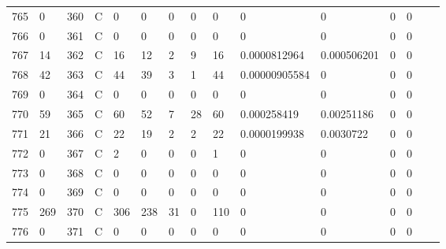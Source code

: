 \begin{longtable}{lllllllllllllll}
	765 & 0                 & 360 & C   & 0                 & 0                 & 0                 & 0    & 0          & 0              & 0              & 0             & 0            \\
	766 & 0                 & 361 & C   & 0                 & 0                 & 0                 & 0    & 0          & 0              & 0              & 0             & 0            \\
	767 & 14                & 362 & C   & 16                & 12                & 2                 & 9    & 16         & 0.0000812964   & 0.000506201    & 0             & 0            \\
	768 & 42                & 363 & C   & 44                & 39                & 3                 & 1    & 44         & 0.00000905584  & 0              & 0             & 0            \\
	769 & 0                 & 364 & C   & 0                 & 0                 & 0                 & 0    & 0          & 0              & 0              & 0             & 0            \\
	770 & 59                & 365 & C   & 60                & 52                & 7                 & 28   & 60         & 0.000258419    & 0.00251186     & 0             & 0            \\
	771 & 21                & 366 & C   & 22                & 19                & 2                 & 2    & 22         & 0.0000199938   & 0.0030722      & 0             & 0            \\
	772 & 0                 & 367 & C   & 2                 & 0                 & 0                 & 0    & 1          & 0              & 0              & 0             & 0            \\
	773 & 0                 & 368 & C   & 0                 & 0                 & 0                 & 0    & 0          & 0              & 0              & 0             & 0            \\
	774 & 0                 & 369 & C   & 0                 & 0                 & 0                 & 0    & 0          & 0              & 0              & 0             & 0            \\
	775 & 269               & 370 & C   & 306               & 238               & 31                & 0    & 110        & 0              & 0              & 0             & 0            \\
	776 & 0                 & 371 & C   & 0                 & 0                 & 0                 & 0    & 0          & 0              & 0              & 0             & 0            \\

\end{longtable}

